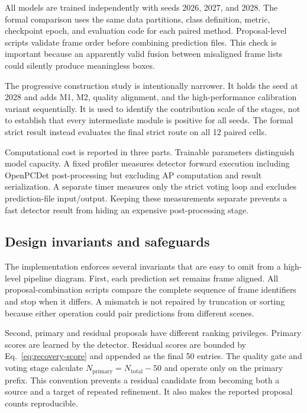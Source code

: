 \documentclass[preprint,12pt,times]{elsarticle}
\begin{document}
All models are trained independently with seeds 2026, 2027, and 2028. The
formal comparison uses the same data partitions, class definition, metric,
checkpoint epoch, and evaluation code for each paired method. Proposal-level
scripts validate frame order before combining prediction files. This check is
important because an apparently valid fusion between misaligned frame lists
could silently produce meaningless boxes.

The progressive construction study is intentionally narrower. It holds the
seed at 2028 and adds M1, M2, quality alignment, and the high-performance
calibration variant sequentially. It is used to identify the contribution
scale of the stages, not to establish that every intermediate module is
positive for all seeds. The formal strict result instead evaluates the final
strict route on all 12 paired cells.

Computational cost is reported in three parts. Trainable parameters distinguish
model capacity. A fixed profiler measures detector forward execution including
OpenPCDet post-processing but excluding AP computation and result
serialization. A separate timer measures only the strict voting loop and
excludes prediction-file input/output. Keeping these measurements separate
prevents a fast detector result from hiding an expensive post-processing
stage.

\subsection{Design invariants and safeguards}

The implementation enforces several invariants that are easy to omit from a
high-level pipeline diagram. First, each prediction set remains frame aligned.
All proposal-combination scripts compare the complete sequence of frame
identifiers and stop when it differs. A mismatch is not repaired by truncation
or sorting because either operation could pair predictions from different
scenes.

Second, primary and residual proposals have different ranking privileges.
Primary scores are learned by the detector. Residual scores are bounded by
Eq.~\eqref{eq:recovery-score} and appended as the final 50 entries. The
quality gate and voting stage calculate
$N_{\mathrm{primary}}=N_{\mathrm{total}}-50$ and operate only on the primary
prefix. This convention prevents a residual candidate from becoming both a
source and a target of repeated refinement. It also makes the reported
proposal counts reproducible.
\end{document}
